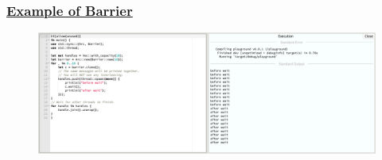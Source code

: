 % 
% 
\begin{frame}[fragile]
    \frametitle{\href{https://doc.rust-lang.org/std/sync/struct.Barrier.html}{Example of Barrier}}
    \begin{figure}
    \includegraphics[width=1.0\linewidth]{figs/demo-barrier.png}
    \end{figure}

\end{frame}
% 
% 
% 
% 
% 
% 
